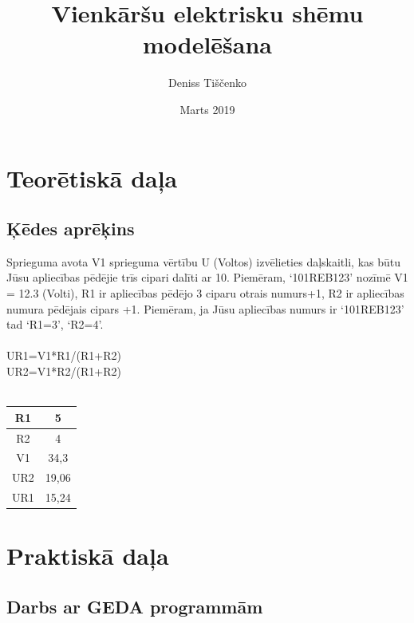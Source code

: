 \documentclass{report}
\title{Vienkāršu elektrisku shēmu modelēšana}
\author{Deniss Tiščenko }
\date{Marts 2019}
\begin{document}
\maketitle

\chapter{Teorētiskā daļa}

\section{Ķēdes aprēķins}
 Sprieguma avota V1 sprieguma vērtību U (Voltos) izvēlieties daļskaitli, kas būtu Jūsu apliecības pēdējie trīs cipari dalīti ar 10. Piemēram, ‘101REB123’ nozīmē V1 = 12.3 (Volti), R1 ir apliecības pēdējo 3 ciparu otrais numurs+1, R2 ir apliecības numura pēdējais cipars +1. Piemēram, ja Jūsu apliecības numurs ir ‘101REB123’ tad ‘R1=3’, ‘R2=4’.
\\
\\
UR1=V1*R1/(R1+R2)
\\
UR2=V1*R2/(R1+R2)
\\
\\
\begin{center}
\begin{tabular}{ | c | c | } 
\hline
R1 & 5 \\ 
\hline
R2 & 4 \\ 
\hline
V1 & 34,3 \\ 
\hline
UR2 & 19,06 \\ 
\hline
UR1 & 15,24 \\ 
\hline
\end{tabular}
\end{center}




\chapter{Praktiskā daļa}

\section{Darbs ar GEDA programmām}
\end{document}
